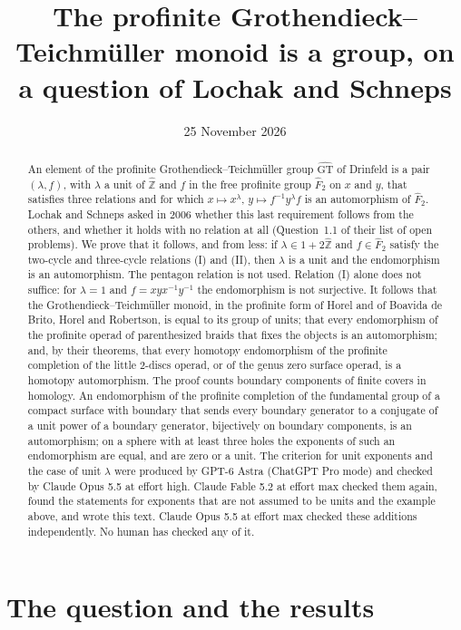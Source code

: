 \documentclass[11pt]{amsart}
\title[The profinite Grothendieck--Teichm\"uller monoid is a group]{The profinite Grothendieck--Teichm\"uller monoid is a group, on a question of Lochak and Schneps}
\author{}
\date{25 November 2026}
\theoremstyle{definition}
\theoremstyle{remark}
\newcommand{\Zh}{\widehat{\mathbb Z}}
\newcommand{\Fh}{\widehat F}
\newcommand{\GT}{\widehat{\mathrm{GT}}}
\begin{document}
\begin{abstract}
An element of the profinite Grothendieck--Teichm\"uller group $\GT$ of Drinfeld is a pair $(\lambda,f)$, with $\lambda$ a unit of $\Zh$ and $f$ in the free profinite group $\Fh_2$ on $x$ and $y$, that satisfies three relations and for which $x\mapsto x^\lambda$, $y\mapsto f^{-1}y^\lambda f$ is an automorphism of $\Fh_2$. Lochak and Schneps asked in 2006 whether this last requirement follows from the others, and whether it holds with no relation at all (Question~1.1 of their list of open problems). We prove that it follows, and from less: if $\lambda\in1+2\Zh$ and $f\in\Fh_2$ satisfy the two-cycle and three-cycle relations (I) and (II), then $\lambda$ is a unit and the endomorphism is an automorphism. The pentagon relation is not used. Relation (I) alone does not suffice: for $\lambda=1$ and $f=xyx^{-1}y^{-1}$ the endomorphism is not surjective. It follows that the Grothendieck--Teichm\"uller monoid, in the profinite form of Horel and of Boavida de Brito, Horel and Robertson, is equal to its group of units; that every endomorphism of the profinite operad of parenthesized braids that fixes the objects is an automorphism; and, by their theorems, that every homotopy endomorphism of the profinite completion of the little $2$-discs operad, or of the genus zero surface operad, is a homotopy automorphism. The proof counts boundary components of finite covers in homology. An endomorphism of the profinite completion of the fundamental group of a compact surface with boundary that sends every boundary generator to a conjugate of a unit power of a boundary generator, bijectively on boundary components, is an automorphism; on a sphere with at least three holes the exponents of such an endomorphism are equal, and are zero or a unit. The criterion for unit exponents and the case of unit $\lambda$ were produced by GPT-6 Astra (ChatGPT Pro mode) and checked by Claude Opus 5.5 at effort high. Claude Fable 5.2 at effort max checked them again, found the statements for exponents that are not assumed to be units and the example above, and wrote this text. Claude Opus 5.5 at effort max checked these additions independently. No human has checked any of it.
\end{abstract}

\maketitle

\section{The question and the results}
\end{document}
